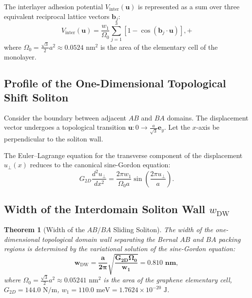 \documentclass[12pt,a4paper]{article}
\newtheorem{theorem}{Theorem}
\begin{document}
			The interlayer adhesion potential $V_{\text{inter}}(\mathbf{u})$ is represented as a sum over three equivalent reciprocal lattice vectors $\mathbf{b}_j$:
			\begin{equation}
				V_{\text{inter}}(\mathbf{u}) = \frac{w_1}{\Omega_0} \sum_{j=1}^3 \left[ 1 - \cos(\mathbf{b}_j \cdot \mathbf{u}) \right],
+			\end{equation}
			where $\Omega_0 = \frac{\sqrt{3}}{2} a^2 \approx 0.0524\text{ nm}^2$ is the area of the elementary cell of the monolayer.
			
			\subsection{Profile of the One-Dimensional Topological Shift Soliton}
			Consider the boundary between adjacent $AB$ and $BA$ domains. The displacement vector undergoes a topological transition $\mathbf{u}: 0 \to \frac{a}{\sqrt{3}} \mathbf{e}_y$. Let the $x$-axis be perpendicular to the soliton wall.
			
			The Euler--Lagrange equation for the transverse component of the displacement $u_\perp(x)$ reduces to the canonical sine-Gordon equation:
			\begin{equation}
				G_{2D} \frac{d^2 u_\perp}{dx^2} = \frac{2\pi w_1}{\Omega_0 a} \sin\left( \frac{2\pi u_\perp}{a} \right).
			\end{equation}
			
			\subsection{Width of the Interdomain Soliton Wall $w_{\text{DW}}$}
			\begin{theorem}[Width of the $AB/BA$ Sliding Soliton]
				The width of the one-dimensional topological domain wall separating the Bernal $AB$ and $BA$ packing regions is determined by the variational solution of the sine-Gordon equation:
				\begin{equation}
					\mathbf{w_{\mathrm{DW}} = \frac{a}{2\pi} \sqrt{\frac{G_{2D} \Omega_0}{w_1}} = \mathbf{0.810\text{ nm}}},
				\end{equation}
				where $\Omega_0 = \frac{\sqrt{3}}{2} a^2 \approx 0.05241\text{ nm}^2$ is the area of the graphene elementary cell, $G_{2D} = 144.0\text{ N/m}$, $w_1 = 110.0\text{ meV} = 1.7624 \times 10^{-20}\text{ J}$.
			\end{theorem}
			
\end{document}

